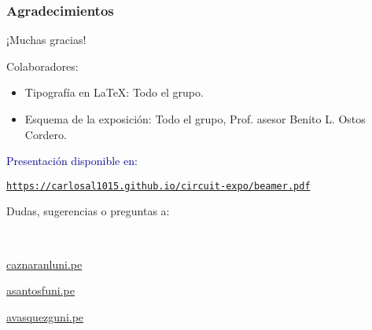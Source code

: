 \begin{frame}
	\frametitle{Agradecimientos}
	\begin{center}\Large
		¡Muchas gracias!
	\end{center}

	Colaboradores:

	\begin{itemize}
		\item Tipografía en \LaTeX{}: Todo el grupo.
		\item Esquema de la exposición: Todo el grupo, Prof. asesor Benito L. Ostos Cordero.
	\end{itemize}
	\vfill
	\begin{minipage}{0.45\paperwidth}
		\textcolor{DarkBlue}{Presentación disponible en:}
		\begin{center}
			\href{https://carlosal1015.github.io/circuit-expo/slides.pdf}{\texttt{https://carlosal1015.github.io/circuit-expo/beamer.pdf}}
		\end{center}
	\end{minipage}
	\hfill
	\begin{minipage}{0.45\paperwidth}
		\begin{flushright}
			Dudas, sugerencias o preguntas a:

			\

			\href{mailto:caznaranl@uni.pe}{caznaranl\MVAt uni.pe}

			\href{mailto:asantosf@uni.pe}{asantosf\MVAt uni.pe}

			\href{mailto:avasquezg@uni.pe}{avasquezg\MVAt uni.pe}
		\end{flushright}
	\end{minipage}

\end{frame}

